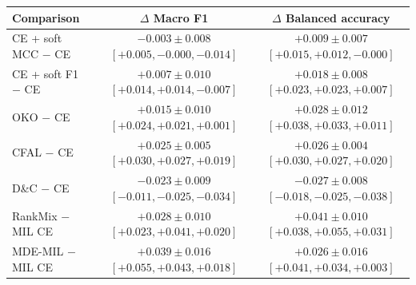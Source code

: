 \begin{tabular}{lcc}
\toprule
Comparison & $\Delta$ Macro F1 & $\Delta$ Balanced accuracy\\
\midrule
CE + soft MCC $-$ CE & $-0.003 \pm 0.008$ {\scriptsize $[+0.005, -0.000, -0.014]$} & $+0.009 \pm 0.007$ {\scriptsize $[+0.015, +0.012, -0.000]$}\\
CE + soft F1 $-$ CE & $+0.007 \pm 0.010$ {\scriptsize $[+0.014, +0.014, -0.007]$} & $+0.018 \pm 0.008$ {\scriptsize $[+0.023, +0.023, +0.007]$}\\
OKO $-$ CE & $+0.015 \pm 0.010$ {\scriptsize $[+0.024, +0.021, +0.001]$} & $+0.028 \pm 0.012$ {\scriptsize $[+0.038, +0.033, +0.011]$}\\
CFAL $-$ CE & $+0.025 \pm 0.005$ {\scriptsize $[+0.030, +0.027, +0.019]$} & $+0.026 \pm 0.004$ {\scriptsize $[+0.030, +0.027, +0.020]$}\\
D\&C $-$ CE & $-0.023 \pm 0.009$ {\scriptsize $[-0.011, -0.025, -0.034]$} & $-0.027 \pm 0.008$ {\scriptsize $[-0.018, -0.025, -0.038]$}\\
RankMix $-$ MIL CE & $+0.028 \pm 0.010$ {\scriptsize $[+0.023, +0.041, +0.020]$} & $+0.041 \pm 0.010$ {\scriptsize $[+0.038, +0.055, +0.031]$}\\
MDE-MIL $-$ MIL CE & $+0.039 \pm 0.016$ {\scriptsize $[+0.055, +0.043, +0.018]$} & $+0.026 \pm 0.016$ {\scriptsize $[+0.041, +0.034, +0.003]$}\\
\bottomrule
\end{tabular}
